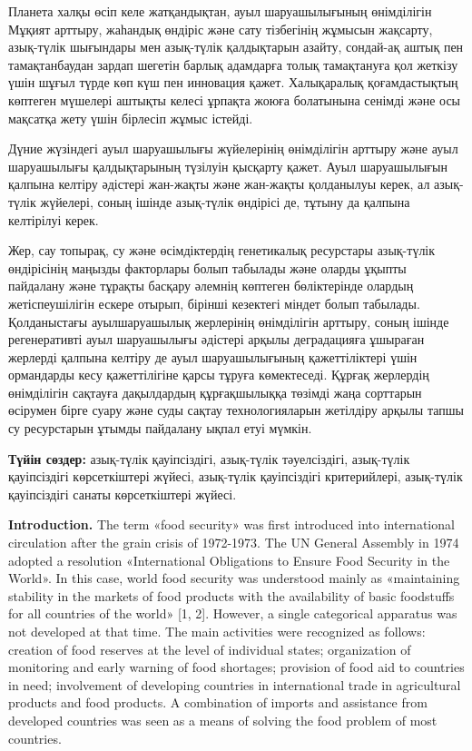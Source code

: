 {Планета халқы өсіп келе жатқандықтан, ауыл шаруашылығының өнімділігін
Мұқият арттыру, жаһандық өндіріс және сату тізбегінің жұмысын жақсарту,
азық-түлік шығындары мен азық-түлік қалдықтарын азайту, сондай-ақ аштық
пен тамақтанбаудан зардап шегетін барлық адамдарға толық тамақтануға қол
жеткізу үшін шұғыл түрде көп күш пен инновация қажет. Халықаралық
қоғамдастықтың көптеген мүшелері аштықты келесі ұрпақта жоюға болатынына
сенімді және осы мақсатқа жету үшін бірлесіп жұмыс істейді.

Дүние жүзіндегі ауыл шаруашылығы жүйелерінің өнімділігін арттыру және
ауыл шаруашылығы қалдықтарының түзілуін қысқарту қажет. Ауыл
шаруашылығын қалпына келтіру әдістері жан-жақты және жан-жақты
қолданылуы керек, ал азық-түлік жүйелері, соның ішінде азық-түлік
өндірісі де, тұтыну да қалпына келтірілуі керек.

Жер, сау топырақ, су және өсімдіктердің генетикалық ресурстары
азық-түлік өндірісінің маңызды факторлары болып табылады және оларды
ұқыпты пайдалану және тұрақты басқару әлемнің көптеген бөліктерінде
олардың жетіспеушілігін ескере отырып, бірінші кезектегі міндет болып
табылады. Қолданыстағы ауылшаруашылық жерлерінің өнімділігін арттыру,
соның ішінде регенеративті ауыл шаруашылығы әдістері арқылы деградацияға
ұшыраған жерлерді қалпына келтіру де ауыл шаруашылығының қажеттіліктері
үшін ормандарды кесу қажеттілігіне қарсы тұруға көмектеседі. Құрғақ
жерлердің өнімділігін сақтауға дақылдардың құрғақшылыққа төзімді жаңа
сорттарын өсірумен бірге суару және суды сақтау технологияларын
жетілдіру арқылы тапшы су ресурстарын ұтымды пайдалану ықпал етуі
мүмкін.

{\bfseries Түйін сөздер:} азық-түлік қауіпсіздігі, азық-түлік тәуелсіздігі,
азық-түлік қауіпсіздігі көрсеткіштері жүйесі, азық-түлік қауіпсіздігі
критерийлері, азық-түлік қауіпсіздігі санаты көрсеткіштері жүйесі.

{\bfseries Introduction.} The term «food security» was first introduced
into international circulation after the grain crisis of 1972-1973. The
UN General Assembly in 1974 adopted a resolution «International
Obligations to Ensure Food Security in the World». In this case, world
food security was understood mainly as «maintaining stability in the
markets of food products with the availability of basic foodstuffs for
all countries of the world» {[}1, 2{]}. However, a single categorical
apparatus was not developed at that time. The main activities were
recognized as follows: creation of food reserves at the level of
individual states; organization of monitoring and early warning of food
shortages; provision of food aid to countries in need; involvement of
developing countries in international trade in agricultural products and
food products. A combination of imports and assistance from developed
countries was seen as a means of solving the food problem of most
countries.

}
